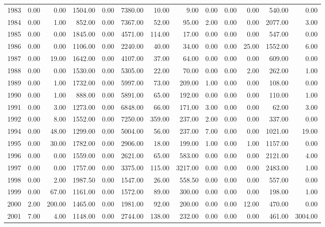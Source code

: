 \begin{sidewaystable}
{\begin{tabular}{rrrrrrrrrrrrr}
  1983 & 0.00 & 0.00 & 1504.00 & 0.00 & 7380.00 & 10.00 & 9.00 & 0.00 & 0.00 & 0.00 & 540.00 & 0.00 \\ 
  1984 & 0.00 & 1.00 & 852.00 & 0.00 & 7367.00 & 52.00 & 95.00 & 2.00 & 0.00 & 0.00 & 2077.00 & 3.00 \\ 
  1985 & 0.00 & 0.00 & 1845.00 & 0.00 & 4571.00 & 114.00 & 17.00 & 0.00 & 0.00 & 0.00 & 547.00 & 0.00 \\ 
  1986 & 0.00 & 0.00 & 1106.00 & 0.00 & 2240.00 & 40.00 & 34.00 & 0.00 & 0.00 & 25.00 & 1552.00 & 6.00 \\ 
  1987 & 0.00 & 19.00 & 1642.00 & 0.00 & 4107.00 & 37.00 & 64.00 & 0.00 & 0.00 & 0.00 & 609.00 & 0.00 \\ 
  1988 & 0.00 & 0.00 & 1530.00 & 0.00 & 5305.00 & 22.00 & 70.00 & 0.00 & 0.00 & 2.00 & 262.00 & 1.00 \\ 
  1989 & 0.00 & 1.00 & 1732.00 & 0.00 & 5997.00 & 73.00 & 209.00 & 1.00 & 0.00 & 0.00 & 108.00 & 0.00 \\ 
  1990 & 0.00 & 1.00 & 888.00 & 0.00 & 5891.00 & 65.00 & 192.00 & 0.00 & 0.00 & 0.00 & 110.00 & 1.00 \\ 
  1991 & 0.00 & 3.00 & 1273.00 & 0.00 & 6848.00 & 66.00 & 171.00 & 3.00 & 0.00 & 0.00 & 62.00 & 3.00 \\ 
  1992 & 0.00 & 8.00 & 1552.00 & 0.00 & 7250.00 & 359.00 & 237.00 & 2.00 & 0.00 & 0.00 & 337.00 & 0.00 \\ 
  1994 & 0.00 & 48.00 & 1299.00 & 0.00 & 5004.00 & 56.00 & 237.00 & 7.00 & 0.00 & 0.00 & 1021.00 & 19.00 \\ 
  1995 & 0.00 & 30.00 & 1782.00 & 0.00 & 2906.00 & 18.00 & 199.00 & 1.00 & 0.00 & 1.00 & 1157.00 & 0.00 \\ 
  1996 & 0.00 & 0.00 & 1559.00 & 0.00 & 2621.00 & 65.00 & 583.00 & 0.00 & 0.00 & 0.00 & 2121.00 & 4.00 \\ 
  1997 & 0.00 & 0.00 & 1757.00 & 0.00 & 3375.00 & 115.00 & 3217.00 & 0.00 & 0.00 & 0.00 & 2483.00 & 1.00 \\ 
  1998 & 0.00 & 2.00 & 1987.50 & 0.00 & 1547.00 & 26.00 & 558.50 & 0.00 & 0.00 & 0.00 & 557.00 & 0.00 \\ 
  1999 & 0.00 & 67.00 & 1161.00 & 0.00 & 1572.00 & 89.00 & 300.00 & 0.00 & 0.00 & 0.00 & 198.00 & 1.00 \\ 
  2000 & 2.00 & 200.00 & 1465.00 & 0.00 & 1981.00 & 92.00 & 200.00 & 0.00 & 0.00 & 12.00 & 470.00 & 0.00 \\ 
  2001 & 7.00 & 4.00 & 1148.00 & 0.00 & 2744.00 & 138.00 & 232.00 & 0.00 & 0.00 & 0.00 & 461.00 & 3004.00 \\ 

\end{tabular}}
\end{sidewaystable}
